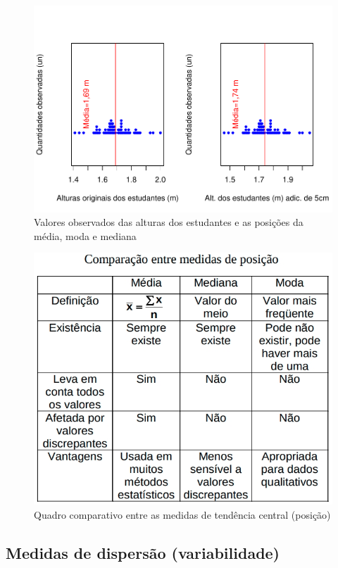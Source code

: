 \documentclass[
]{book}
\begin{document}
\begin{figure}

{\centering \includegraphics[width=0.8\linewidth]{apostila_files/figure-latex/unnamed-chunk-27-1} 

}

\caption{Valores observados das alturas dos estudantes e as posições da média, moda e mediana}\label{fig:unnamed-chunk-27}
\end{figure}

\hfill\break

\begin{figure}

{\centering \includegraphics[width=0.8\linewidth]{images3/comp_sinteses} 

}

\caption{Quadro comparativo entre as medidas de tendência central (posição)}\label{fig:unnamed-chunk-28}
\end{figure}

\hypertarget{medidas-de-dispersuxe3o-variabilidade}{%
\subsection{Medidas de dispersão (variabilidade)}\label{medidas-de-dispersuxe3o-variabilidade}}
\end{document}
